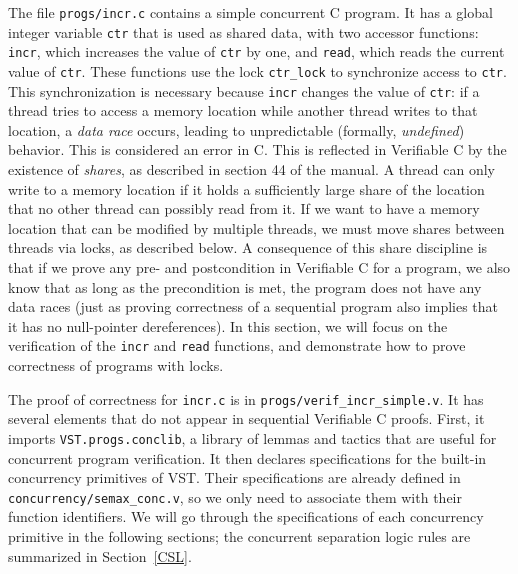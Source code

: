 \documentclass[11pt]{article} %
\begin{document}
The file \texttt{progs/incr.c} contains a simple concurrent C program. It has a global integer variable \texttt{ctr} that is used as shared data, with two accessor functions: \texttt{incr}, which increases the value of \texttt{ctr} by one, and \texttt{read}, which reads the current value of \texttt{ctr}. These functions use the lock \texttt{ctr\_lock} to synchronize access to \texttt{ctr}. This synchronization is necessary because \texttt{incr} changes the value of \texttt{ctr}: if a thread tries to access a memory location while another thread writes to that location, a \emph{data race} occurs, leading to unpredictable (formally, \emph{undefined}) behavior. This is considered an error in C. This is reflected in Verifiable C by the existence of \emph{shares}, as described in section 44 of the manual. A thread can only write to a memory location if it holds a sufficiently large share of the location that no other thread can possibly read from it. If we want to have a memory location that can be modified by multiple threads, we must move shares between threads via locks, as described below. A consequence of this share discipline is that if we prove any pre- and postcondition in Verifiable C for a program, we also know that as long as the precondition is met, the program does not have any data races (just as proving correctness of a sequential program also implies that it has no null-pointer dereferences). In this section, we will focus on the verification of the \texttt{incr} and \texttt{read} functions, and demonstrate how to prove correctness of programs with locks.

The proof of correctness for \texttt{incr.c} is in \texttt{progs/verif\_incr\_simple.v}. It has several elements that do not appear in sequential Verifiable C proofs. First, it imports \texttt{VST.progs.conclib}, a library of lemmas and tactics that are useful for concurrent program verification. It then declares specifications for the built-in concurrency primitives of VST. Their specifications are already defined in \texttt{concurrency/semax\_conc.v}, so we only need to associate them with their function identifiers. We will go through the specifications of each concurrency primitive in the following sections; the concurrent separation logic rules are summarized in Section~\ref{CSL}.
\end{document}

